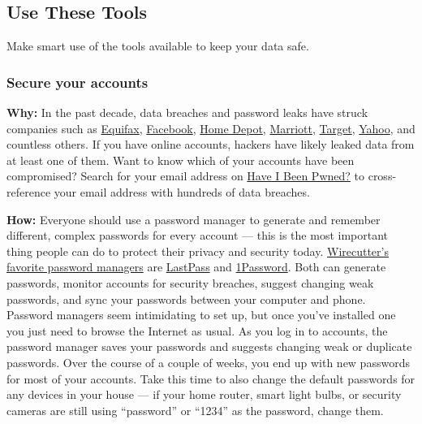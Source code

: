 \hypertarget{use-these-tools}{%
\subsection{Use These Tools}\label{use-these-tools}}

Make smart use of the tools available to keep your data safe.~

\hypertarget{secure-your-accounts}{%
\subsubsection{Secure your accounts}\label{secure-your-accounts}}

\textbf{Why:} In the past decade, data breaches and password leaks have
struck companies such as
\href{https://www.nytimes3xbfgragh.onion/interactive/2017/your-money/equifax-data-breach-credit.html\#first}{Equifax},
\href{https://www.nytimes3xbfgragh.onion/2019/03/21/technology/personaltech/facebook-passwords.html}{Facebook},
\href{https://bits.blogs.nytimes3xbfgragh.onion/2014/09/08/home-depot-confirms-that-it-was-hacked/}{Home
Depot},
\href{https://www.nytimes3xbfgragh.onion/2018/11/30/business/marriott-data-breach.html}{Marriott},
\href{https://www.nytimes3xbfgragh.onion/2014/01/18/business/a-sneaky-path-into-target-customers-wallets.html}{Target},
\href{https://www.nytimes3xbfgragh.onion/2017/10/03/technology/yahoo-hack-3-billion-users.html}{Yahoo},
and countless others. If you have online accounts, hackers have likely
leaked data from at least one of them. Want to know which of your
accounts have been compromised? Search for your email address on
\href{https://haveibeenpwned.com/}{Have I Been Pwned?} to
cross-reference your email address with hundreds of data breaches.~

\textbf{How:} Everyone should use a password manager to generate and
remember different, complex passwords for every account --- this is the
most important thing people can do to protect their privacy and security
today.
\href{https://thewirecutter.com/reviews/best-password-managers/}{Wirecutter's
favorite password managers} are
\href{https://www.lastpass.com/}{LastPass} and
\href{https://1password.com/}{1Password}. Both can generate passwords,
monitor accounts for security breaches, suggest changing weak passwords,
and sync your passwords between your computer and phone. Password
managers seem intimidating to set up, but once you've installed one you
just need to browse the Internet as usual. As you log in to accounts,
the password manager saves your passwords and suggests changing weak or
duplicate passwords. Over the course of a couple of weeks, you end up
with new passwords for most of your accounts. Take this time to also
change the default passwords for any devices in your house --- if your
home router, smart light bulbs, or security cameras are still using
``password'' or ``1234'' as the password, change them.

